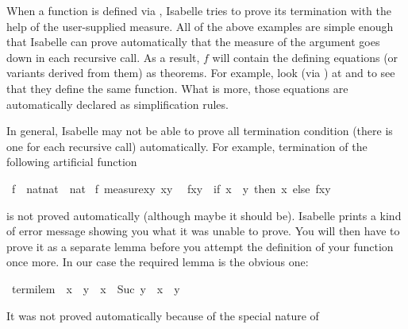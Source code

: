 %
\begin{isabellebody}%
\def\isabellecontext{termination}%
%
\begin{isamarkuptext}%
When a function is defined via , Isabelle tries to prove
its termination with the help of the user-supplied measure.  All of the above
examples are simple enough that Isabelle can prove automatically that the
measure of the argument goes down in each recursive call. As a result,
$f$ will contain the defining equations (or variants derived
from them) as theorems. For example, look (via ) at
 and  to see that they define
the same function. What is more, those equations are automatically declared as
simplification rules.

In general, Isabelle may not be able to prove all termination condition
(there is one for each recursive call) automatically. For example,
termination of the following artificial function%
\end{isamarkuptext}%
\ f\ {\isacharcolon}{\isacharcolon}\ {\isachardoublequote}nat{\isasymtimes}nat\ {\isasymRightarrow}\ nat{\isachardoublequote}\isanewline
{}\ f\ {\isachardoublequote}measure{\isacharparenleft}{\isasymlambda}{\isacharparenleft}x{\isacharcomma}y{\isacharparenright}{\isachardot}\ x{\isacharminus}y{\isacharparenright}{\isachardoublequote}\isanewline
\ \ {\isachardoublequote}f{\isacharparenleft}x{\isacharcomma}y{\isacharparenright}\ {\isacharequal}\ {\isacharparenleft}if\ x\ {\isasymle}\ y\ then\ x\ else\ f{\isacharparenleft}x{\isacharcomma}y{\isacharplus}%
\begin{isamarkuptext}%
\noindent
is not proved automatically (although maybe it should be). Isabelle prints a
kind of error message showing you what it was unable to prove. You will then
have to prove it as a separate lemma before you attempt the definition
of your function once more. In our case the required lemma is the obvious one:%
\end{isamarkuptext}%
\ termi{\isacharunderscore}lem{\isacharcolon}\ {\isachardoublequote}{\isasymnot}\ x\ {\isasymle}\ y\ {\isasymLongrightarrow}\ x\ {\isacharminus}\ Suc\ y\ {\isacharless}\ x\ {\isacharminus}\ y{\isachardoublequote}%
\begin{isamarkuptxt}%
\noindent
It was not proved automatically because of the special nature of \isa{{\isacharminus}}

\end{isamarkuptxt}
\end{isabellebody}
